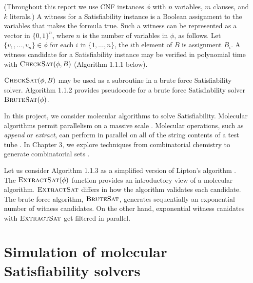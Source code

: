(Throughout this report we use CNF instances $\phi$ with $n$ variables, $m$ clauses, and $k$ literals.)  A witness for a {\sc Satisfiability} instance is a Boolean assignment to the variables that makes the formula true.  Such a witness can be represented as a vector in $\{0,1\}^n$, where $n$ is the number of variables in $\phi$, as follows.  Let $\{v_1, \ldots , v_n\} \in \phi$ for each $i$ in $\{1, \ldots , n\}$, the $i$th element of $B$ is assignment $B_i$.   A witness candidate for a {\sc Satisfiability} instance may be verified in polynomial time with $\text{\sc CheckSat}(\phi, B)$ (Algorithm 1.1.1 below).

\FloatBarrier 



\FloatBarrier 

$\text{\sc CheckSat}(\phi, B)$ may be used as a subroutine in a brute force {\sc Satisfiability} solver.  Algorithm 1.1.2 provides pseudocode for a brute force {\sc Satisfiability} solver $\text{\sc BruteSat}(\phi)$.  

\FloatBarrier 



In this project, we consider molecular algorithms to solve {\sc Satisfiability}.  Molecular algorithms permit parallelism on a massive scale \cite{Adleman:1994:MCS:189441.189442, Lipton95usingdna}.  Molecular operations, such as \textit{append} or \textit{extract}, can perform in parallel on all of the string contents of a test tube \cite{Adleman:1994:MCS:189441.189442, Lipton95usingdna, dnaComputingModels2008}.  In Chapter 3, we explore techniques from combinatorial chemistry to generate combinatorial sets \cite{Lipton95usingdna, furkaBook, dnaComputingModels2008}.


\FloatBarrier 

Let us consider Algorithm 1.1.3 as a simplified version of Lipton's algorithm \cite{Lipton95usingdna, dnaComputingModels2008}.  The $\text{\sc ExtractSat}(\phi)$ function provides an introductory view of a molecular algorithm.  $\text{\sc ExtractSat}$ differs in how the algorithm validates each candidate.  The brute force algorithm, $\text{\sc BruteSat}$, generates sequentially an exponential number of witness candidates.  On the other hand, exponential witness canidates with $\text{\sc ExtractSat}$ get filtered in parallel.  
				
\section{Simulation of molecular {\sc Satisfiability} solvers}
	
